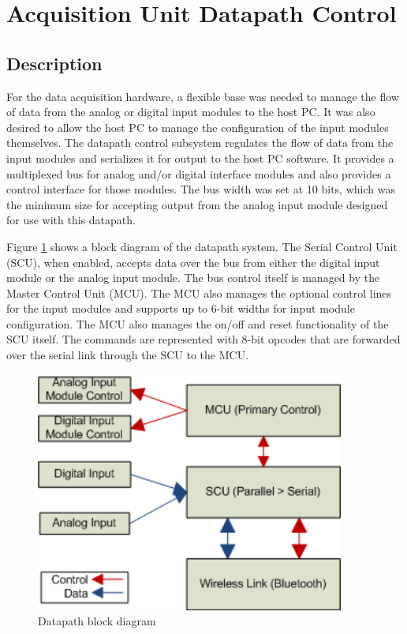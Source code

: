 \section[Datapath Control]{Acquisition Unit Datapath Control}
\subsection{Description}
For the data acquisition hardware, a flexible base was needed to manage the 
flow of data from the analog or digital input modules to the host PC. It was 
also desired to allow the host PC to manage the configuration of the input 
modules themselves. The datapath control subsystem regulates the flow of data 
from the input modules and serializes it for output to 
the host PC software. It provides a multiplexed bus for analog and/or 
digital interface modules and also provides a control interface for those 
modules. The bus width was set at 10 bits, which was the minimum size for
 accepting output from the analog input module designed for use with this 
datapath.

Figure \ref{fig:datapath diagram} shows a block diagram of the datapath system. 
The Serial Control Unit (SCU), when enabled, accepts data over the bus from 
either the digital input module or the analog input module. The bus control 
itself is managed by the Master Control Unit (MCU). The MCU also 
manages the optional control lines for the input modules and supports up to 
6-bit widths for input module configuration. The MCU also manages the on/off 
and reset functionality of the SCU itself. The commands are represented with 8-bit opcodes that are forwarded over the serial link through the SCU to the MCU. 

\begin{figure}[hbp]
\caption{Datapath block diagram}
\begin{center}
\includegraphics[width=4in]{../drawings/datapath_block.png}
\end{center}
\label{fig:datapath diagram}
\end{figure}
